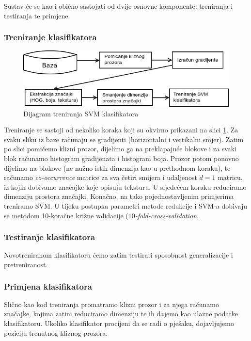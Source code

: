 \documentclass[seminar]{fer}
\begin{document}
Sustav će se kao i obično sastojati od dvije osnovne komponente: treniranja i testiranja te primjene.

\subsubsection{Treniranje klasifikatora}

\begin{figure}[h!]
\center
\includegraphics[scale=0.7]{img/treniranje.png}
\caption{Dijagram treniranja SVM klasifikatora}
\label{treniranje}
\end{figure}

Treniranje se sastoji od nekoliko koraka koji su okvirno prikazani na slici \ref{treniranje}.
Za svaku sliku iz baze računaju se gradijenti (horizontalni i vertikalni smjer). Zatim po slici pomičemo
klizni prozor, dijelimo ga na preklapajuće blokove i za svaki blok računamo histogram gradijenata i histogram boja. Prozor potom ponovno dijelimo
na blokove (ne nužno istih dimenzija kao u prethodnom koraku), te računamo \emph{co-occurrence} matrice za sva četiri smijera i udaljenost $d = 1$ matricu, iz kojih dobivamo značajke koje opisuju
teksturu. U sljedećem koraku reduciramo dimenziju prostora značajki. Konačno, na tako pojednostavljenim primjerima treniramo SVM. U tijeku postupka parametri metode redukcije i SVM-a dobivaju se metodom 10-koračne križne validacije (\emph{$10$-fold-cross-validation}.

\subsubsection{Testiranje klasifikatora}

Novotreniranom klasifikatoru ćemo zatim testirati sposobnost generalizacije i pretreniranost. 

\subsubsection{Primjena klasifikatora}

Slično kao kod treniranja promatramo klizni prozor i za njega računamo značajke, kojima zatim reduciramo dimenziju te ih dajemo kao ulazne podatke klasifikatoru. Ukoliko klasifikator procijeni da se radi o pješaku, dojavljujemo poziciju trenutnog kliznog prozora.
\end{document}
